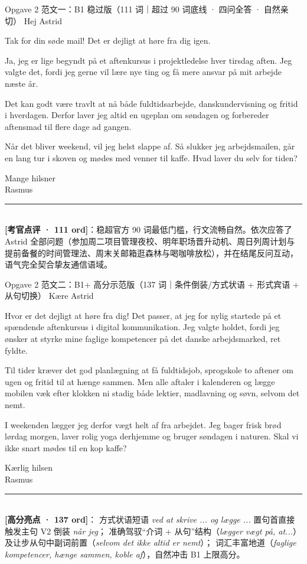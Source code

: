 \begin{emailbox}{Opgave 2 范文一：B1 稳过版（111 词｜超过 90 词底线 · 四问全答 · 自然亲切）}
Hej Astrid

Tak for din søde mail! Det er dejligt at høre fra dig igen.

Ja, jeg er lige begyndt på et aftenkursus i projektledelse hver tirsdag aften. Jeg valgte det, fordi jeg gerne vil lære nye ting og få mere ansvar på mit arbejde næste år.

Det kan godt være travlt at nå både fuldtidsarbejde, danskundervisning og fritid i hverdagen. Derfor laver jeg altid en ugeplan om søndagen og forbereder aftensmad til flere dage ad gangen.

Når det bliver weekend, vil jeg helst slappe af. Så slukker jeg arbejdsmailen, går en lang tur i skoven og mødes med venner til kaffe. Hvad laver du selv for tiden?

Mange hilsner\\
Rasmus

\vspace{0.3em}
\rule{\linewidth}{0.4pt}\\[0.2em]
\small\textbf{\color{NCDTeal}[考官点评 · 111 ord]}：稳超官方 90 词最低门槛，行文流畅自然。依次应答了 Astrid 全部问题（参加周二项目管理夜校、明年职场晋升动机、周日列周计划与提前备餐的时间管理法、周末关邮箱逛森林与喝咖啡放松），并在结尾反问互动，语气完全契合挚友通信语域。
\end{emailbox}

\begin{emailbox}{Opgave 2 范文二：B1+ 高分示范版（137 词｜条件倒装/方式状语 + 形式宾语 + 从句切换）}
Kære Astrid

Hvor er det dejligt at høre fra dig! Det passer, at jeg for nylig startede på et spændende aftenkursus i digital kommunikation. Jeg valgte holdet, fordi jeg ønsker at styrke mine faglige kompetencer på det danske arbejdsmarked,  ret fyldte.

Til tider kræver det god planlægning at få fuldtidsjob, sprogskole to aftener om ugen og fritid til at hænge sammen. Men  alle aftaler i kalenderen og lægge mobilen væk efter klokken ni  stadig både lektier, madlavning og søvn, selvom det  nemt.

I weekenden lægger jeg derfor vægt  helt af fra arbejdet. Jeg bager frisk brød lørdag morgen, laver rolig yoga derhjemme og bruger søndagen i naturen. Skal vi ikke snart mødes til en kop kaffe?

Kærlig hilsen\\
Rasmus

\vspace{0.3em}
\rule{\linewidth}{0.4pt}\\[0.2em]
\small\textbf{\color{NCDNavy}[高分亮点 · 137 ord]}： 方式状语短语 \textit{ved at skrive ... og lægge ...} 置句首直接触发主句 V2 倒装 \textit{når jeg}； 准确驾驭“介词 + 从句”结构（\textit{lægger vægt på, at...}）及让步从句中副词前置（\textit{selvom det ikke altid er nemt}）； 词汇丰富地道（\textit{faglige kompetencer, hænge sammen, koble af}），自然冲击 B1 上限高分。
\end{emailbox}

